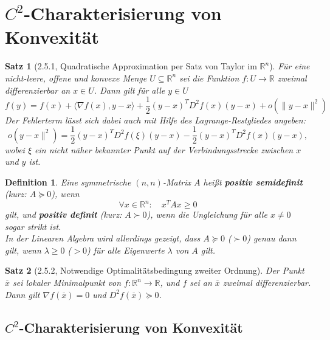 \documentclass[12pt]{extreport} %
\newcommand{\R}{\mathbb{R}}
\theoremstyle{named}
\theoremstyle{nnamed}
\theoremstyle{itshape}
\newtheorem*{satz}{Satz}
\newtheorem*{definition}{Definition}
\theoremstyle{normal}
\begin{document}
\newpage

\section{$C^2$-Charakterisierung von Konvexität}

\begin{satz}[2.5.1, Quadratische Approximation per Satz von Taylor im $\R^n$]
	Für eine nicht-leere, offene und konvexe Menge $U \subseteq \R^n$ sei die Funktion $f \colon U \rightarrow \R$ zweimal differenzierbar an $x \in U$. Dann gilt für alle $y \in U$
	$$ f(y) = f(x) + \langle \nabla f(x), y - x \rangle + \frac{1}{2} \left( y - x \right)^T D^2 f(x) (y - x) + o\left( \| y - x \|^2 \right) $$	
	Der Fehlerterm lässt sich dabei auch mit Hilfe des Lagrange-Restgliedes angeben:
	$$ o\left( y - x \|^2 \right) = \frac{1}{2} \left( y - x \right)^T D^2 f(\xi) (y - x ) - \frac{1}{2} \left(y - x \right)^T D^2 f(x) (y -x ), $$
	wobei $\xi$ ein nicht näher bekannter Punkt auf der Verbindungsstrecke zwischen $x$ und $y$ ist.
\end{satz}

\begin{definition}
	Eine symmetrische $(n, n)$-Matrix $A$ heißt \textbf{positiv semidefinit} (kurz: $A \succeq 0$), wenn
	$$ \forall x \in \R^n: \quad x^T A x \geq 0 $$
	gilt, und \textbf{positiv definit} (kurz: $A \succ 0$), wenn die Ungleichung für alle $x \neq 0$ sogar strikt ist. ~\\
	
	In der Linearen Algebra wird allerdings gezeigt, dass $A \succeq 0$ ($\succ 0$) genau dann gilt, wenn $\lambda \geq 0$ ($> 0$) für alle Eigenwerte $\lambda$ von $A$ gilt. 
\end{definition}

\begin{satz}[2.5.2, Notwendige Optimalitätsbedingung zweiter Ordnung]
	Der Punkt $\overline{x}$ sei lokaler Minimalpunkt von $f \colon \R^n \rightarrow \R$, und $f$ sei an $\overline{x}$ zweimal differenzierbar. Dann gilt $\nabla f(\overline{x}) = 0$ und $D^2 f(\overline{x}) \succeq 0$.
\end{satz}

\subsection*{$C^2$-Charakterisierung von Konvexität}
\end{document}

